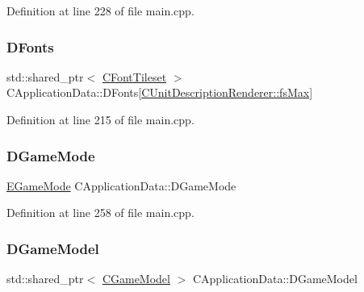 Definition at line 228 of file main.\+cpp.

\hypertarget{classCApplicationData_afde9247d0a3ea87393ec86dcdb1e8274}{}\label{classCApplicationData_afde9247d0a3ea87393ec86dcdb1e8274} 
\subsubsection{\texorpdfstring{D\+Fonts}{DFonts}}
{\footnotesize\ttfamily std\+::shared\+\_\+ptr$<$ \hyperlink{classCFontTileset}{C\+Font\+Tileset} $>$ C\+Application\+Data\+::\+D\+Fonts\mbox{[}\hyperlink{classCUnitDescriptionRenderer_a3ea4cd83b6dd9533ab3abb953a7da35aa74218e4708bac1eab359099eb0b159b2}{C\+Unit\+Description\+Renderer\+::fs\+Max}\mbox{]}\hspace{0.3cm}{\ttfamily [protected]}}



Definition at line 215 of file main.\+cpp.

\hypertarget{classCApplicationData_a2f906f2b4208ecb2a057e6b62e549685}{}\label{classCApplicationData_a2f906f2b4208ecb2a057e6b62e549685} 
\subsubsection{\texorpdfstring{D\+Game\+Mode}{DGameMode}}
{\footnotesize\ttfamily \hyperlink{classCApplicationData_ac8ac37a4c8bb871036fbbdc6a072e403}{E\+Game\+Mode} C\+Application\+Data\+::\+D\+Game\+Mode\hspace{0.3cm}{\ttfamily [protected]}}



Definition at line 258 of file main.\+cpp.

\hypertarget{classCApplicationData_a32b50c7c1cbac3cfd67c7f775b1d6fee}{}\label{classCApplicationData_a32b50c7c1cbac3cfd67c7f775b1d6fee} 
\subsubsection{\texorpdfstring{D\+Game\+Model}{DGameModel}}
{\footnotesize\ttfamily std\+::shared\+\_\+ptr$<$ \hyperlink{classCGameModel}{C\+Game\+Model} $>$ C\+Application\+Data\+::\+D\+Game\+Model\hspace{0.3cm}{\ttfamily [protected]}}



